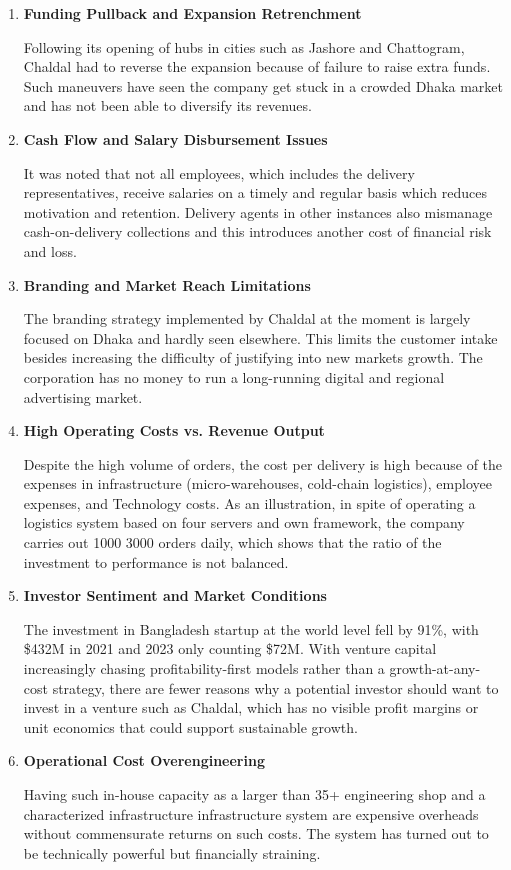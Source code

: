 \documentclass[12pt,a4paper]{article}
\begin{document}
\begin{enumerate}
    \item \textbf{Funding Pullback and Expansion Retrenchment}
    
    Following its opening of hubs in cities such as Jashore and Chattogram, Chaldal had to reverse the expansion because of failure to raise extra funds. Such maneuvers have seen the company get stuck in a crowded Dhaka market and has not been able to diversify its revenues.
    
    \item \textbf{Cash Flow and Salary Disbursement Issues}
    
    It was noted that not all employees, which includes the delivery representatives, receive salaries on a timely and regular basis which reduces motivation and retention. Delivery agents in other instances also mismanage cash-on-delivery collections and this introduces another cost of financial risk and loss.
    
    \item \textbf{Branding and Market Reach Limitations}
    
    The branding strategy implemented by Chaldal at the moment is largely focused on Dhaka and hardly seen elsewhere. This limits the customer intake besides increasing the difficulty of justifying into new markets growth. The corporation has no money to run a long-running digital and regional advertising market.
    
    \item \textbf{High Operating Costs vs. Revenue Output}
    
    Despite the high volume of orders, the cost per delivery is high because of the expenses in infrastructure (micro-warehouses, cold-chain logistics), employee expenses, and Technology costs. As an illustration, in spite of operating a logistics system based on four servers and own framework, the company carries out 1000 3000 orders daily, which shows that the ratio of the investment to performance is not balanced.
    
    \item \textbf{Investor Sentiment and Market Conditions}
    
    The investment in Bangladesh startup at the world level fell by 91\%, with \$432M in 2021 and 2023 only counting \$72M. With venture capital increasingly chasing profitability-first models rather than a growth-at-any-cost strategy, there are fewer reasons why a potential investor should want to invest in a venture such as Chaldal, which has no visible profit margins or unit economics that could support sustainable growth.
    
    \item \textbf{Operational Cost Overengineering}
    
    Having such in-house capacity as a larger than 35+ engineering shop and a characterized infrastructure infrastructure system are expensive overheads without commensurate returns on such costs. The system has turned out to be technically powerful but financially straining.
\end{enumerate}
\end{document}

